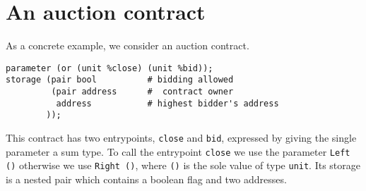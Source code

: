 \documentclass[a4paper,USenglish,american,cleveref, autoref, thm-restate]{oasics-v2021}
\begin{document}
\section{An auction contract}
\label{sec:an-auction-contract}

As a concrete example, we consider an auction contract. 
\begin{lstlisting}[language=michelson,numbers=none,emph={close,bid},emphstyle=\underbar]
parameter (or (unit %close) (unit %bid));
storage (pair bool          # bidding allowed
         (pair address      #  contract owner
          address           # highest bidder's address
        ));
\end{lstlisting}
This contract has two entrypoints, \lstinline/close/ and \lstinline/bid/,
expressed by giving the single parameter a sum type. To call the
entrypoint \lstinline/close/ we use the parameter \lstinline/Left ()/
otherwise we use \lstinline/Right ()/, where \lstinline/()/ is the sole
value of type \lstinline/unit/. Its storage is a nested pair which
contains a boolean flag and two addresses. 




\end{document}
